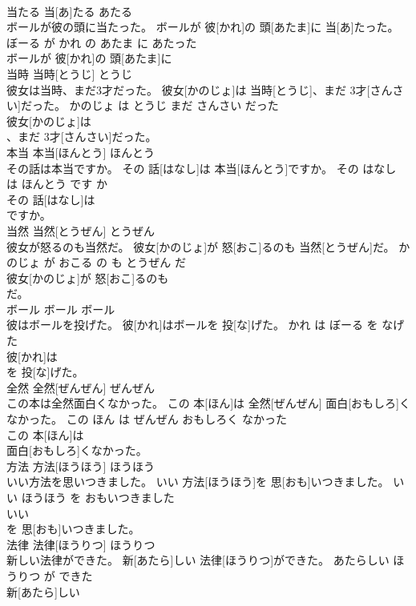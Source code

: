 \documentclass[8pt]{extreport}
\begin{document}
\begin{CJK}{UTF8}{min}
\\	当たる	当[あ]たる	あたる	
\\	ボールが彼の頭に当たった。	ボールが 彼[かれ]の 頭[あたま]に 当[あ]たった。	ぼーる が かれ の あたま に あたった	
\\	ボールが 彼[かれ]の 頭[あたま]に
\\	当時	当時[とうじ]	とうじ	
\\	彼女は当時、まだ3才だった。	彼女[かのじょ]は 当時[とうじ]、まだ 3才[さんさい]だった。	かのじょ は とうじ まだ さんさい だった	
\\	彼女[かのじょ]は
\\	、まだ 3才[さんさい]だった。		
\\	本当	本当[ほんとう]	ほんとう	
\\	その話は本当ですか。	その 話[はなし]は 本当[ほんとう]ですか。	その はなし は ほんとう です か	
\\	その 話[はなし]は
\\	ですか。		
\\	当然	当然[とうぜん]	とうぜん	
\\	彼女が怒るのも当然だ。	彼女[かのじょ]が 怒[おこ]るのも 当然[とうぜん]だ。	かのじょ が おこる の も とうぜん だ	
\\	彼女[かのじょ]が 怒[おこ]るのも
\\	だ。		
\\	ボール	ボール	ボール	
\\	彼はボールを投げた。	彼[かれ]はボールを 投[な]げた。	かれ は ぼーる を なげた	
\\	彼[かれ]は
\\	を 投[な]げた。		
\\	全然	全然[ぜんぜん]	ぜんぜん	
\\	この本は全然面白くなかった。	この 本[ほん]は 全然[ぜんぜん] 面白[おもしろ]くなかった。	この ほん は ぜんぜん おもしろく なかった	
\\	この 本[ほん]は
\\	面白[おもしろ]くなかった。		
\\	方法	方法[ほうほう]	ほうほう	
\\	いい方法を思いつきました。	いい 方法[ほうほう]を 思[おも]いつきました。	いい ほうほう を おもいつきました	
\\	いい
\\	を 思[おも]いつきました。		
\\	法律	法律[ほうりつ]	ほうりつ	
\\	新しい法律ができた。	新[あたら]しい 法律[ほうりつ]ができた。	あたらしい ほうりつ が できた	
\\	新[あたら]しい

\end{CJK}
\end{document}
